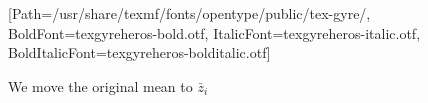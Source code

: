 \documentclass{standalone}
\begin{document}
%
\setmainfont{texgyreheros-regular.otf}%
[Path=/usr/share/texmf/fonts/opentype/public/tex-gyre/,%
 BoldFont=texgyreheros-bold.otf,%
 ItalicFont=texgyreheros-italic.otf,%
 BoldItalicFont=texgyreheros-bolditalic.otf]%
\fontsize{12}{14.4}%
\selectfont{}%
\begin{minipage}{1.5in}
We move the original mean to $\bar z_i$%
\end{minipage}
\end{document}
